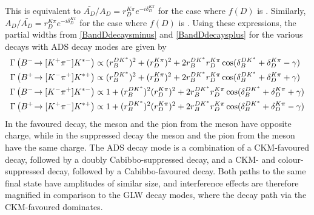 This is equivalent to $\bar{A_{D}}/A_{D} = r_D^{K\pi}e^{-i\delta_D^{K\pi}}$ for the case where $f(D)$ is \Km\pip. Similarly, $A_{D}/\bar{A_{D}} = r_D^{K\pi}e^{-i\delta_D^{K\pi}}$ for the case where $f(D)$ is \Kp\pim. Using these expressions, the partial widths from \eqn\ref{BandDdecaysminus} and \ref{BandDdecaysplus} for the various \decay{\Bpm}{\D\Kstarpm} decays with ADS decay modes are given by
\begin{align}
\Gamma\left({{{B}^-}}\!\rightarrow [{{K}^+}{{\pi}^-}]{\ensuremath{{K}^{*-}}}\right) &\propto (r_B^{DK^*})^2 + (r_D^{K\pi})^2 + 2r_B^{DK^*}r_D^{K\pi}\cos(\delta_B^{DK^*} + \delta_D^{K\pi} - \gamma) \label{adsBdecaym} \\
\Gamma\left({{{B}^+}}\!\rightarrow [{{K}^-}{{\pi}^+}]{\ensuremath{{K}^{*+}}}\right) &\propto (r_B^{DK^*})^2 + (r_D^{K\pi})^2 + 2r_B^{DK^*}r_D^{K\pi}\cos(\delta_B^{DK^*} + \delta_D^{K\pi} + \gamma) \label{adsBdecayp} \\
\Gamma\left({{{B}^-}}\!\rightarrow [{{K}^-}{{\pi}^+}]{\ensuremath{{K}^{*-}}}\right) &\propto 1 + (r_B^{DK^*})^2(r_D^{K\pi})^2 + 2r_B^{DK^*}r_D^{K\pi}\cos(\delta_B^{DK^*} + \delta_D^{K\pi} + \gamma) \label{favBdecaym} \\
\Gamma\left({{{B}^+}}\!\rightarrow [{{K}^+}{{\pi}^-}]{\ensuremath{{K}^{*+}}}\right) &\propto 1 + (r_B^{DK^*})^2(r_D^{K\pi})^2 + 2r_B^{DK^*}r_D^{K\pi}\cos(\delta_B^{DK^*} + \delta_D^{K\pi} - \gamma) \label{favBdecayp} 
\end{align}
In the favoured decay, the \Kstarm meson and the pion from the \D meson have opposite charge, while in the suppressed decay the \Kstarm meson and the pion from the \D meson have the same charge. The ADS decay mode is a combination of a CKM-favoured \decay{\Bm}{\Dz\Kstarm} decay, followed by a doubly Cabibbo-suppressed \decay{\Dz}{\Kp\pim} decay, and a CKM- and colour-suppressed \decay{\Bm}{\Dzb\Kstarm} decay, followed by a Cabibbo-favoured \decay{\Dzb}{\Kp\pim} decay. Both paths to the same final state have amplitudes of similar size, and interference effects are therefore magnified in comparison to the GLW decay modes, where the decay path via the CKM-favoured \decay{\Bm}{\Dz\Kstarm} dominates.

